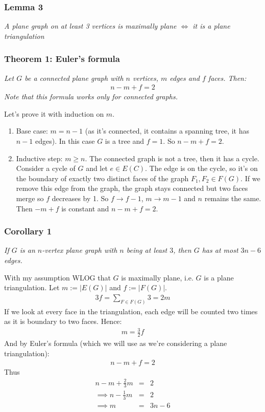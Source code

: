 \documentclass[11pt]{book}
\begin{document}
		
		\subsubsection{Lemma 3}
		\textit{A plane graph on at least 3 vertices is maximally plane $\iff$ it is a plane triangulation}
		
		
		\subsubsection{Theorem 1: Euler's formula}
		\textit{Let $G$ be a connected plane graph with $n$ vertices, $m$ edges and $f$ faces. Then:}
		\begin{eqnarray}
			n - m + f = 2
		\end{eqnarray}
		\textit{Note that this formula works only for connected graphs.\\}
		
		Let's prove it with induction on $m$.
		\begin{enumerate}
			\item Base case: $m = n -1$ (as it's connected, it contains a spanning tree, it has $n - 1$ edges). In this case $G$ is a tree and $f = 1$. So $n - m + f = 2$.
			\item Inductive step: $m \geq n$. The connected graph is not a tree, then it has a cycle. Consider a cycle of $G$ and let $e \in E(C)$. The edge is on the cycle, so it's on the boundary of exactly two distinct faces of the graph $F_1, F_2 \in F(G)$. If we remove this edge from the graph, the graph stays connected but two faces merge so $f$ decreases by 1. So $f \rightarrow f -1$, $m \rightarrow m - 1$ and $n$ remains the same. Then $-m + f$ is constant and $n -m + f = 2$.
		\end{enumerate}
		
		\subsubsection{Corollary 1} 
		\textit{If $G$ is an $n$-vertex plane graph with $n$ being at least $3$, then $G$ has at most $3n - 6$ edges.\\}
		
		With my assumption WLOG that $G$ is maximally plane, i.e. $G$ is a plane triangulation. Let $m := |E(G)|$ and $f := |F(G)|$.
		\begin{eqnarray}
			3f = \sum_{F \in F(G)} 3 = 2m
		\end{eqnarray}
		If we look at every face in the triangulation, each edge will be counted two times as it is boundary to two faces. Hence:
		\begin{eqnarray}
			m = \frac{3}{2} f
		\end{eqnarray}
		And by Euler's formula (which we will use as we're considering a plane triangulation):
		\begin{eqnarray}
			n - m + f = 2
		\end{eqnarray}
		Thus 
		\begin{eqnarray}
			n - m + \frac{2}{3}m &=& 2 \\
			\implies n - \frac{1}{3} m &=& 2 \\
			\implies m &=& 3n - 6
		\end{eqnarray}
		
\end{document}
